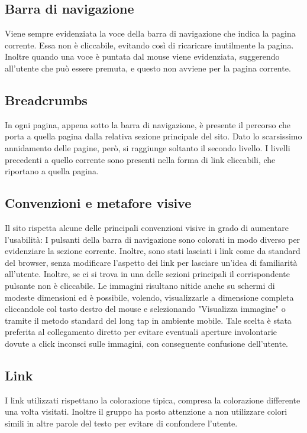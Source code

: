 \documentclass{article}
\begin{document}
\subsection{Barra di navigazione}
 Viene sempre evidenziata la voce della barra di navigazione che indica la pagina corrente. Essa non è cliccabile, evitando così di ricaricare inutilmente la pagina. Inoltre quando una voce è puntata dal mouse viene evidenziata, suggerendo all’utente che può essere premuta, e questo non avviene per la pagina corrente.
	
\subsection{Breadcrumbs}
In ogni pagina, appena sotto la barra di navigazione, è presente il percorso che porta a quella pagina dalla relativa sezione principale del sito. Dato lo scarsissimo annidamento delle pagine, però, si raggiunge soltanto il secondo livello. I livelli precedenti a quello corrente sono presenti nella forma di link cliccabili, che riportano a quella pagina.
\subsection{Convenzioni e metafore visive}
Il sito rispetta alcune delle principali convenzioni visive in grado di aumentare l'usabilità:\newline
			I pulsanti della barra di navigazione sono colorati in modo diverso per evidenziare la sezione corrente. Inoltre, sono stati lasciati i link come da standard del browser, senza modificare l'aspetto dei link per lasciare un'idea di familiarità all'utente.\newline
			Inoltre, se ci si trova in una delle sezioni principali il corrispondente pulsante non è cliccabile.
			Le immagini risultano nitide anche su schermi di modeste dimensioni ed è possibile, volendo, visualizzarle a dimensione completa cliccandole col tasto destro del mouse e selezionando "Visualizza immagine" o tramite il metodo standard del long tap in ambiente mobile. Tale scelta è stata preferita al collegamento diretto per evitare eventuali aperture involontarie dovute a click inconsci sulle immagini, con conseguente confusione dell'utente.\newline
\subsection{Link}
I link utilizzati rispettano la colorazione tipica, compresa la colorazione differente una volta visitati. Inoltre il gruppo ha
posto attenzione a non utilizzare colori simili in altre parole del testo per evitare di confondere l'utente.
\end{document}
